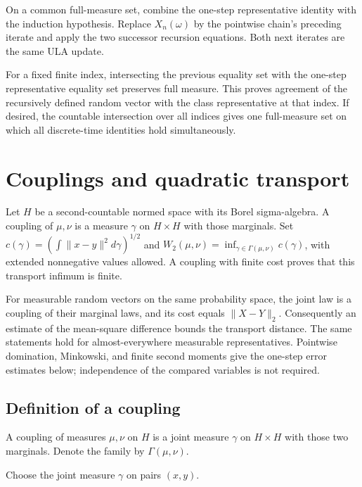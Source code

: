 \documentclass[11pt,a4paper]{article}
\begin{document}
On a common full-measure set, combine the one-step representative identity with the induction hypothesis. Replace \(X_n(\omega)\) by the pointwise chain’s preceding iterate and apply the two successor recursion equations. Both next iterates are the same ULA update.



For a fixed finite index, intersecting the previous equality set with the one-step representative equality set preserves full measure. This proves agreement of the recursively defined random vector with the class representative at that index. If desired, the countable intersection over all indices gives one full-measure set on which all discrete-time identities hold simultaneously.


\section{\texorpdfstring{Couplings and quadratic transport}{Couplings and quadratic transport}}


Let \(H\) be a second-countable normed space with its Borel sigma-algebra. A coupling of \(\mu,\nu\) is a measure \(\gamma\) on \(H\times H\) with those marginals. Set \(c(\gamma)=(\int\|x-y\|^2d\gamma)^{1/2}\) and \(W_2(\mu,\nu)=\inf_{\gamma\in\Gamma(\mu,\nu)}c(\gamma)\), with extended nonnegative values allowed. A coupling with finite cost proves that this transport infimum is finite.



For measurable random vectors on the same probability space, the joint law is a coupling of their marginal laws, and its cost equals \(\|X-Y\|_2\). Consequently an estimate of the mean-square difference bounds the transport distance. The same statements hold for almost-everywhere measurable representatives. Pointwise domination, Minkowski, and finite second moments give the one-step error estimates below; independence of the compared variables is not required.


\subsection{\texorpdfstring{Definition of a coupling}{Definition of a coupling}}


A coupling of measures \(\mu,\nu\) on \(H\) is a joint measure \(\gamma\) on \(H\times H\) with those two marginals. Denote the family by \(\Gamma(\mu,\nu)\).



Choose the joint measure \(\gamma\) on pairs \((x,y)\).
\end{document}
